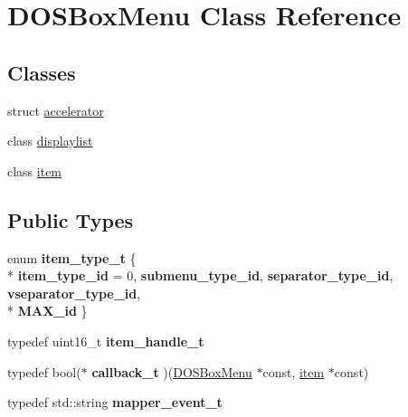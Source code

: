 \hypertarget{classDOSBoxMenu}{\section{D\-O\-S\-Box\-Menu Class Reference}
\label{classDOSBoxMenu}
}
\subsection*{Classes}
\begin{DoxyCompactItemize}
\item 
struct \hyperlink{structDOSBoxMenu_1_1accelerator}{accelerator}
\item 
class \hyperlink{classDOSBoxMenu_1_1displaylist}{displaylist}
\item 
class \hyperlink{classDOSBoxMenu_1_1item}{item}
\end{DoxyCompactItemize}
\subsection*{Public Types}
\begin{DoxyCompactItemize}
\item 
enum {\bfseries item\-\_\-type\-\_\-t} \{ \\*
{\bfseries item\-\_\-type\-\_\-id} = 0, 
{\bfseries submenu\-\_\-type\-\_\-id}, 
{\bfseries separator\-\_\-type\-\_\-id}, 
{\bfseries vseparator\-\_\-type\-\_\-id}, 
\\*
{\bfseries M\-A\-X\-\_\-id}
 \}
\item 
\hypertarget{classDOSBoxMenu_abaf17cb34e95d5c8e35801ca7b500436}{typedef uint16\-\_\-t {\bfseries item\-\_\-handle\-\_\-t}}\label{classDOSBoxMenu_abaf17cb34e95d5c8e35801ca7b500436}

\item 
\hypertarget{classDOSBoxMenu_a68296dd8ed73e192cde70e24b491543b}{typedef bool($\ast$ {\bfseries callback\-\_\-t} )(\hyperlink{classDOSBoxMenu}{D\-O\-S\-Box\-Menu} $\ast$const, \hyperlink{classDOSBoxMenu_1_1item}{item} $\ast$const)}\label{classDOSBoxMenu_a68296dd8ed73e192cde70e24b491543b}

\item 
\hypertarget{classDOSBoxMenu_a8892527321f636a88f1a371e8856e20d}{typedef std\-::string {\bfseries mapper\-\_\-event\-\_\-t}}\label{classDOSBoxMenu_a8892527321f636a88f1a371e8856e20d}

\end{DoxyCompactItemize}
